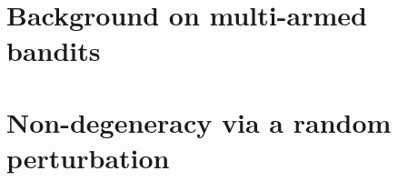 \documentclass[format=acmsmall, review=false]{acmart}
\theoremstyle{definition}
\begin{document}






\gaedit{

}
%

\newpage



\begin{appendices}

\section{Background on multi-armed bandits}
\label{app:examples}


\section{Non-degeneracy via a random perturbation}
\label{app:perturb}



\end{appendices}
\end{document}
